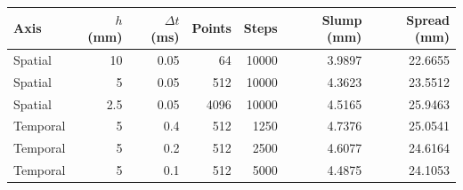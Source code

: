 \begin{tabular}{lrrrrrr}
\toprule
Axis & $h$ (mm) & $\Delta t$ (ms) & Points & Steps & Slump (mm) & Spread (mm) \\
\midrule
Spatial & 10 & 0.05 & 64 & 10000 & 3.9897 & 22.6655 \\
Spatial & 5 & 0.05 & 512 & 10000 & 4.3623 & 23.5512 \\
Spatial & 2.5 & 0.05 & 4096 & 10000 & 4.5165 & 25.9463 \\
Temporal & 5 & 0.4 & 512 & 1250 & 4.7376 & 25.0541 \\
Temporal & 5 & 0.2 & 512 & 2500 & 4.6077 & 24.6164 \\
Temporal & 5 & 0.1 & 512 & 5000 & 4.4875 & 24.1053 \\
\bottomrule
\end{tabular}
